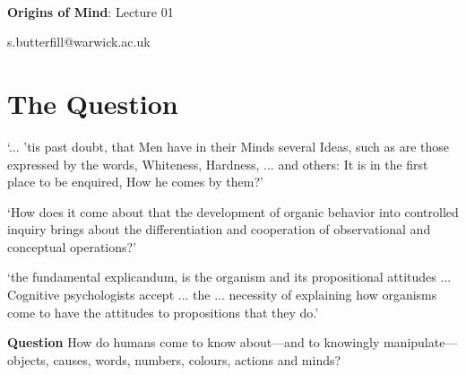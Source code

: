 \documentclass[12pt]{extarticle}
\date{}
\makeatletter
\def \ititle {Origins of Mind}
\def \isubtitle {Lecture 01}
\def \iemail{s.butterfill@warwick.ac.uk}
\makeatother
\begin{document}
\begin{multicols}{3}

\setlength\footnotesep{1em}









\def \ititle {Origins of Mind}
 
\def \isubtitle {Lecture 01}
 
 
 
\
 
 
 
\begin{center}
 
{\Large
 
\textbf{\ititle}: \isubtitle
 
}
 
 
 
\iemail %
 
\end{center}
 
 
 
\section{The Question}
 
‘... ’tis past doubt, that Men have in their Minds several Ideas, such as are those expressed by the words, Whiteness, Hardness, ... and others: It is in the first place to be enquired, How he comes by them?’
\citep[p.\ 104]{Locke:1975qo}
 
‘How does it come about that the development of organic behavior into controlled inquiry brings about the differentiation and cooperation of observational and conceptual operations?’
\citep[p.\ 12]{Dewey:1938yp}
 
‘the fundamental explicandum, is the organism and its propositional attitudes ... Cognitive psychologists accept ... the ... necessity of explaining how organisms come to have the attitudes to propositions that they do.’
\citep[p.\ 198]{Fodor:1975pb}
 
\textbf{Question}
How do humans come to know about---and to knowingly manipulate---objects, causes, words, numbers, colours, actions and minds?
 

\end{multicols}
\end{document}
